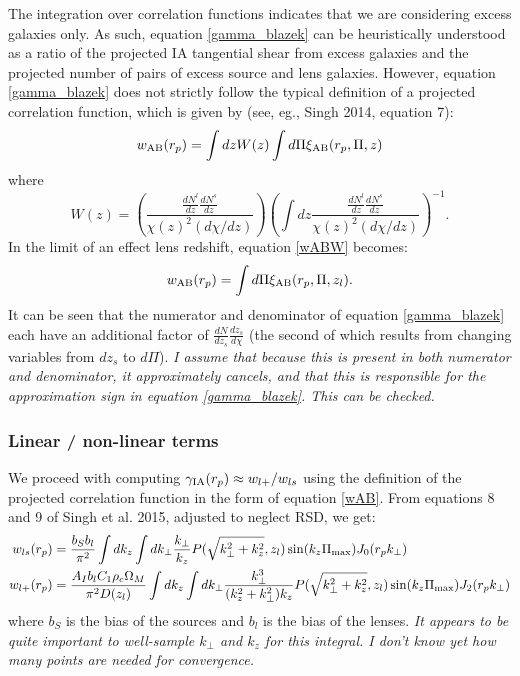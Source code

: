 \documentclass[onecolumn,amsmath,aps,fleqn, superscriptaddress]{revtex4}
\begin{document}
The integration over correlation functions indicates that we are considering excess galaxies only. As such, equation \ref{gamma_blazek} can be heuristically understood as a ratio of the projected IA tangential shear from excess galaxies and the projected number of pairs of excess source and lens galaxies. However, equation \ref{gamma_blazek} does not strictly follow the typical definition of a projected correlation function, which is given by (see, eg., Singh 2014, equation 7):
\begin{equation}
w_{\rm AB}(r_p) = \int dz W(z) \int d\Pi \xi_{\rm AB}(r_p, \Pi, z)
\label{wABW}
\end{equation}
where 
\begin{equation}
W(z) = \left(\frac{\frac{dN^l}{dz}\frac{dN^s}{dz}}{\chi(z)^2 (d\chi/dz)}\right) \left(\int dz \frac{\frac{dN^l}{dz}\frac{dN^s}{dz}}{\chi(z)^2 (d\chi/dz)}\right)^{-1}.
\label{wz}
\end{equation}
In the limit of an effect lens redshift, equation \ref{wABW} becomes:
\begin{equation}
w_{\rm AB}(r_p) = \int d\Pi \xi_{\rm AB}(r_p, \Pi, z_l).
\label{wAB}
\end{equation}
It can be seen that the numerator and denominator of equation \ref{gamma_blazek} each have an additional factor of $\frac{dN}{dz_s}\frac{dz_s}{d\chi}$ (the second of which results from changing variables from $dz_s$ to $d\Pi$). {\it I assume that because this is present in both numerator and denominator, it approximately cancels, and that this is responsible for the approximation sign in equation \ref{gamma_blazek}. This can be checked.} 

\subsubsection*{Linear / non-linear terms}
We proceed with computing $\gamma_{\rm IA}(r_p) \approx w_{l+} / w_{ls}$ using the definition of the projected correlation function in the form of equation \ref{wAB}. From equations 8 and 9 of Singh et al. 2015, adjusted to neglect RSD, we get:
\begin{align}
w_{ls}(r_p) &= \frac{b_S b_l}{\pi^2} \int dk_z  \int dk_\perp  \frac{k_\perp}{k_z} P(\sqrt{k_\perp^2 + k_z^2}, z_l) \sin(k_z \Pi_{\rm max}) J_0(r_p k_\perp) \nonumber \\
w_{l+}(r_p) &= \frac{A_I b_l C_1 \rho_c \Omega_M}{\pi^2 D(z_l)} \int dk_z  \int dk_\perp  \frac{k_\perp^3 }{(k_z^2 + k_\perp^2)k_z} P(\sqrt{k_\perp^2 + k_z^2}, z_l) \sin(k_z \Pi_{\rm max}) J_2(r_p k_\perp)
\label{ws}
\end{align}
where $b_S$ is the bias of the sources and $b_l$ is the bias of the lenses. {\it It appears to be quite important to well-sample $k_\perp$ and $k_z$ for this integral. I don't know yet how many points are needed for convergence.}
\end{document}
